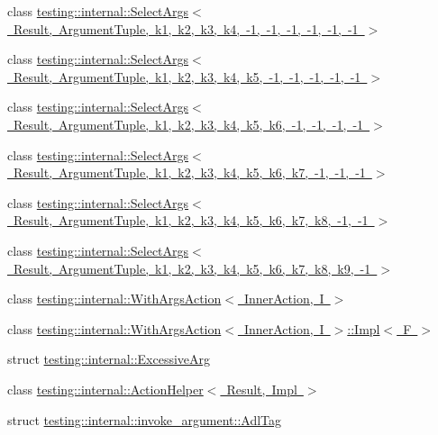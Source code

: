 \begin{DoxyCompactItemize}
\item 
class \mbox{\hyperlink{classtesting_1_1internal_1_1_select_args_3_01_result_00_01_argument_tuple_00_01k1_00_01k2_00_01k7cadbb88f40ff7408f8c070bb61c70db}{testing\+::internal\+::\+Select\+Args$<$ Result, Argument\+Tuple, k1, k2, k3, k4, -\/1, -\/1, -\/1, -\/1, -\/1, -\/1 $>$}}
\item 
class \mbox{\hyperlink{classtesting_1_1internal_1_1_select_args_3_01_result_00_01_argument_tuple_00_01k1_00_01k2_00_01k6061407a5fa2cad2c495e8e16ee67874}{testing\+::internal\+::\+Select\+Args$<$ Result, Argument\+Tuple, k1, k2, k3, k4, k5, -\/1, -\/1, -\/1, -\/1, -\/1 $>$}}
\item 
class \mbox{\hyperlink{classtesting_1_1internal_1_1_select_args_3_01_result_00_01_argument_tuple_00_01k1_00_01k2_00_01k203aa538560773abfacd746d313c06ae}{testing\+::internal\+::\+Select\+Args$<$ Result, Argument\+Tuple, k1, k2, k3, k4, k5, k6, -\/1, -\/1, -\/1, -\/1 $>$}}
\item 
class \mbox{\hyperlink{classtesting_1_1internal_1_1_select_args_3_01_result_00_01_argument_tuple_00_01k1_00_01k2_00_01kf4b89906ed32c76471b80b75f77e1355}{testing\+::internal\+::\+Select\+Args$<$ Result, Argument\+Tuple, k1, k2, k3, k4, k5, k6, k7, -\/1, -\/1, -\/1 $>$}}
\item 
class \mbox{\hyperlink{classtesting_1_1internal_1_1_select_args_3_01_result_00_01_argument_tuple_00_01k1_00_01k2_00_01ke29a32f440a8fcb098d8685a265f9f40}{testing\+::internal\+::\+Select\+Args$<$ Result, Argument\+Tuple, k1, k2, k3, k4, k5, k6, k7, k8, -\/1, -\/1 $>$}}
\item 
class \mbox{\hyperlink{classtesting_1_1internal_1_1_select_args_3_01_result_00_01_argument_tuple_00_01k1_00_01k2_00_01k6840fe77dccd76bc2d4e4ee1c75cd6f1}{testing\+::internal\+::\+Select\+Args$<$ Result, Argument\+Tuple, k1, k2, k3, k4, k5, k6, k7, k8, k9, -\/1 $>$}}
\item 
class \mbox{\hyperlink{structtesting_1_1internal_1_1_with_args_action}{testing\+::internal\+::\+With\+Args\+Action$<$ Inner\+Action, I $>$}}
\item 
class \mbox{\hyperlink{classtesting_1_1internal_1_1_with_args_action_1_1_impl}{testing\+::internal\+::\+With\+Args\+Action$<$ Inner\+Action, I $>$\+::\+Impl$<$ F $>$}}
\item 
struct \mbox{\hyperlink{structtesting_1_1internal_1_1_excessive_arg}{testing\+::internal\+::\+Excessive\+Arg}}
\item 
class \mbox{\hyperlink{classtesting_1_1internal_1_1_action_helper}{testing\+::internal\+::\+Action\+Helper$<$ Result, Impl $>$}}
\item 
struct \mbox{\hyperlink{structtesting_1_1internal_1_1invoke__argument_1_1_adl_tag}{testing\+::internal\+::invoke\+\_\+argument\+::\+Adl\+Tag}}
\end{DoxyCompactItemize}
